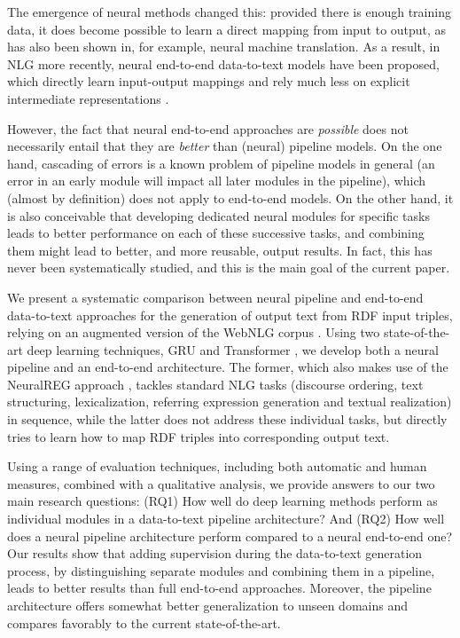 \documentclass[11pt,a4paper]{article}
\begin{document}
The emergence of neural methods changed this: provided there is enough training data, it does become possible to learn a direct mapping from input to output, as has also been shown in, for example, neural machine translation.
As a result, in NLG more recently, neural end-to-end data-to-text models have been proposed, which directly learn input-output mappings and rely much less on explicit intermediate representations \cite{wen2015,dusek2016,mei2016,lebret2016,gehrmann2018}.






However, the fact that neural end-to-end approaches are {\it possible}\/ does not necessarily entail that they are {\it better}\/ than (neural) pipeline models. On the one hand, cascading of errors is a known problem of pipeline models in general (an error in an early module will impact all later modules in the pipeline), which (almost by definition) does not apply to end-to-end models. On the other hand, it is also conceivable that developing dedicated neural modules for specific tasks leads to better performance on each of these successive tasks, and combining them might lead to better, and more reusable, output results. In fact, this has never been systematically studied, and this is the main goal of the current paper.

We present a systematic comparison between neural pipeline and end-to-end data-to-text approaches for the generation of output text from RDF input triples, relying on an augmented version of the WebNLG corpus \cite{claire2017b}. Using two state-of-the-art deep learning techniques, GRU \cite{choetal2014b} and Transformer \cite{vaswani2017}, we develop both a neural pipeline and an end-to-end architecture. The former, which also makes use of the NeuralREG approach \cite{ferreira2018}, tackles standard NLG tasks (discourse ordering, text structuring, lexicalization, referring expression generation and textual realization) in sequence, while the latter does not address these individual tasks, but directly tries to learn how to map RDF triples into corresponding output text.

Using a range of evaluation techniques, including both automatic and human measures, combined with a qualitative analysis, we provide answers to our two main research questions: (RQ1) How well do deep learning methods perform as individual modules in a data-to-text pipeline architecture? And (RQ2) How well does a neural pipeline architecture perform compared to a neural end-to-end one? Our results show that adding supervision during the data-to-text generation process, by distinguishing separate modules and combining them in a pipeline, leads to better results than full end-to-end approaches. Moreover, the pipeline architecture offers somewhat better generalization to unseen domains and compares favorably to the current state-of-the-art.
\end{document}
